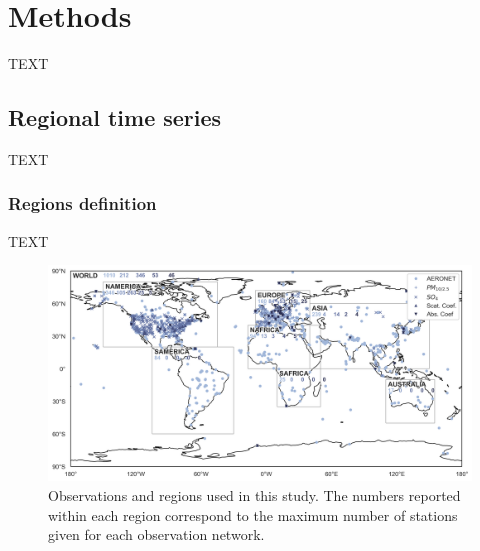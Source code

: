 \documentclass[journal abbreviation, manuscript]{copernicus}
\begin{document}
\section{Methods}
TEXT


\subsection{Regional time series}
TEXT

\subsubsection{Regions definition}
TEXT
\begin{figure}
 \includegraphics[width=\columnwidth]{../scripts/figs/maps/av_obs.png}
 \caption{Observations and regions used in this study. The numbers reported within each region correspond to the maximum number of stations given for each observation network.}
 \label{map_obs}
\end{figure}
\end{document}
